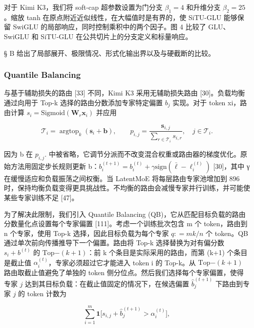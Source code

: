 对于 Kimi K3，我们将 soft-cap 超参数设置为门分支 \(\beta _ { 1 } = 4\) 和升维分支 \(\beta _ { 2 } = 2 5\)。缩放 tanh 在原点附近近似线性，在大幅值时是有界的，使 SiTU-GLU 能够保留 SwiGLU 的局部响应，同时控制乘积中的两个因子。图 4 比较了 GLU、SwiGLU 和 SiTU-GLU 在公共切片上的分支定义和标量响应。

§ B 给出了局部展开、极限情况、形式化输出界以及与硬截断的比较。

\subsubsection{Quantile Balancing}\label{quantile-balancing}

与基于辅助损失的路由 {[}33{]} 不同，Kimi K3 采用无辅助损失路由 {[}30{]}。负载均衡通过向用于 Top-k 选择的路由分数添加专家特定偏置 \(b _ { j }\) 实现。对于 token xi，路由计算 \(s _ { i } = \mathrm { S i g m o i d } ( \mathbf { W } _ { r } \mathbf { x } _ { i } )\) 并应用

\[
\mathcal {T} _ {i} = \operatorname{argtop} _ {k} (\boldsymbol {s} _ {i} + \boldsymbol {b}), \qquad p _ {i, j} = \frac {\boldsymbol {s} _ {i , j}}{\sum_ {r \in \mathcal {T} _ {i}} s _ {i , r}}, \quad j \in \mathcal {T} _ {i}.\tag{13}
\]

因为 b 在 \(p _ { i , j } .\) 中被省略，它调节分派而不改变混合权重或路由器的梯度优化。原始方法用固定步长规则更新 b：\(b _ { i } ^ { ( t + 1 ) } = b _ { i } ^ { ( t ) } + \gamma \mathrm { s i g n } ( \bar { \ell } - \ell _ { i } ^ { ( t ) } )\) {[}30{]}，其中 γ 在缓慢适应和负载振荡之间权衡。当 LatentMoE 将每层路由专家池增加到 896 时，保持均衡负载变得更具挑战性。不均衡的路由会减慢专家并行训练，并可能使某些专家训练不足 {[}47{]}。

为了解决此限制，我们引入 Quantile Balancing (QB)，它从匹配目标负载的路由分数量化点设置每个专家偏置 {[}111{]}。考虑一个训练批次包含 m 个 token，路由到 n 个专家，使用 Top-k 选择，因此目标负载为每个专家 \(q : = m k / n\) 个 token。QB 通过单次前向传播推导下一个偏置。路由将 Top-k 选择替换为对有偏分数 \(s _ { i } + b ^ { ( t ) }\) 的 \(\mathrm { T o p } \mathrm { - } ( k { + } 1 )\)：前 k 个条目是实际采用的路由，而第 (k+1) 个条目是截止值 \(\alpha _ { i } ^ { ( t ) }\)，专家必须超过它才能进入 token i 的 Top-k。从 \(\mathrm { T o p } \mathrm { - } ( k { + } 1 )\) 路由取截止值避免了单独的 token 侧分位点。然后我们选择每个专家偏置，使得专家 \(j\) 达到其目标负载：在截止值固定的情况下，在候选偏置 \(\widehat { b } _ { j } ^ { ( t + 1 ) }\) 下路由到专家 \(j\) 的 token 计数为

\[
\sum_ {i = 1} ^ {m} \mathbf {1} \Big [ s _ {i, j} + \widehat {b} _ {j} ^ {(t + 1)} > \alpha_ {i} ^ {(t)} \Big ],
\]

